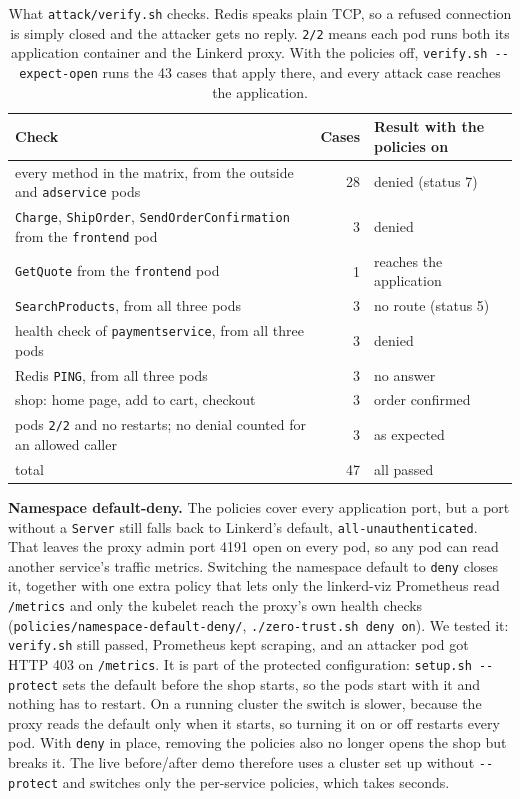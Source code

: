 \documentclass[12pt,a4paper]{article}
\begin{document}
\begin{table}[H]
  \centering
  \footnotesize
  \begin{tabular}{p{8.6cm}rl}
    \toprule
    Check & Cases & Result with the policies on \\
    \midrule
    every method in the matrix, from the outside and \texttt{adservice} pods
      & 28 & denied (status 7) \\
    \texttt{Charge}, \texttt{ShipOrder}, \texttt{SendOrderConfirmation} from
      the \texttt{frontend} pod & 3 & denied \\
    \texttt{GetQuote} from the \texttt{frontend} pod & 1 & reaches the application \\
    \texttt{SearchProducts}, from all three pods & 3 & no route (status 5) \\
    health check of \texttt{paymentservice}, from all three pods & 3 & denied \\
    Redis \texttt{PING}, from all three pods & 3 & no answer \\
    shop: home page, add to cart, checkout & 3 & order confirmed \\
    pods \texttt{2/2} and no restarts; no denial counted for an allowed caller
      & 3 & as expected \\
    \midrule
    total & 47 & all passed \\
    \bottomrule
  \end{tabular}
  \caption{What \texttt{attack/verify.sh} checks. Redis speaks plain TCP, so
    a refused connection is simply closed and the attacker gets no reply.
    \texttt{2/2} means each pod runs both its application container and the
    Linkerd proxy. With the policies off, \texttt{verify.sh -{}-expect-open}
    runs the 43 cases that apply there, and every attack case reaches the
    application.}
  \label{tab:verify}
\end{table}

\textbf{Namespace default-deny.} The policies cover every application port,
but a port without a \texttt{Server} still falls back to Linkerd's default,
\texttt{all-unauthenticated}. That leaves the proxy admin port 4191 open on
every pod, so any pod can read another service's traffic metrics. Switching
the namespace default to \texttt{deny} closes it, together with one extra
policy that lets only the linkerd-viz Prometheus read \texttt{/metrics} and
only the kubelet reach the proxy's own health checks
(\texttt{policies/namespace-default-deny/}, \texttt{./zero-trust.sh deny
on}). We tested it: \texttt{verify.sh} still passed, Prometheus kept
scraping, and an attacker pod got HTTP 403 on \texttt{/metrics}. It is part
of the
protected configuration: \texttt{setup.sh -{}-protect} sets the default before
the shop starts, so the pods start with it and nothing has to restart. On a
running cluster the switch is slower, because the proxy reads the default only
when it starts, so turning it on or off restarts every pod. With \texttt{deny}
in place, removing the policies also no longer opens the shop but breaks it.
The live before/after demo therefore uses a cluster set up without
\texttt{-{}-protect} and switches only the per-service policies, which takes
seconds.
\end{document}
